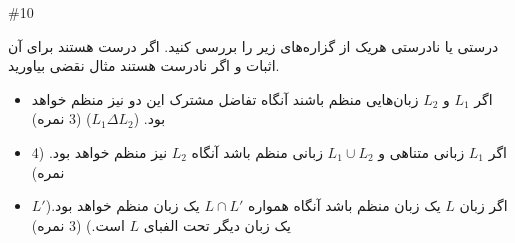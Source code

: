 \documentclass[../HW.tex]{subfiles}
\begin{document}
\question#{10}


درستی یا نادرستی هریک از گزاره‌های زیر را بررسی کنید. اگر درست هستند برای آن اثبات و اگر نادرست هستند مثال نقضی بیاورید.

\begin{itemize}
      \item[\textbf{(a}]
            اگر $L_1$ و $L_2$ زبان‌هایی منظم باشند آنگاه تفاضل مشترک این دو نیز منظم خواهد بود. ($L_1 \Delta L_2$) (3 نمره)


      \item[\textbf{(b}]
            اگر $L_1$ زبانی متناهی و $L_1 \cup L_2$ زبانی منظم باشد آنگاه $L_2$ نیز منظم خواهد بود. (4 نمره)

      \item[\textbf{(c}]
            اگر زبان $L$ یک زبان منظم باشد آنگاه همواره $L \cap L'$ یک زبان منظم خواهد بود.($L'$ یک زبان دیگر تحت الفبای $L$ است.) (3 نمره)


\end{itemize}

\ifcompileanswers\solution
\end{document}
